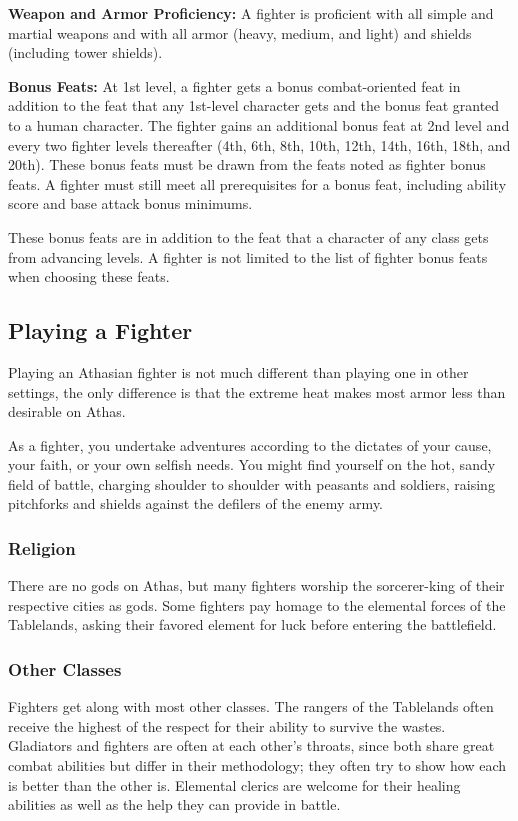 \textbf{Weapon and Armor Proficiency:} A fighter is proficient with all simple and martial weapons and with all armor (heavy, medium, and light) and shields (including tower shields).

\textbf{Bonus Feats:} At 1st level, a fighter gets a bonus combat-oriented feat in addition to the feat that any 1st-level character gets and the bonus feat granted to a human character. The fighter gains an additional bonus feat at 2nd level and every two fighter levels thereafter (4th, 6th, 8th, 10th, 12th, 14th, 16th, 18th, and 20th). These bonus feats must be drawn from the feats noted as fighter bonus feats. A fighter must still meet all prerequisites for a bonus feat, including ability score and base attack bonus minimums.

These bonus feats are in addition to the feat that a character of any class gets from advancing levels. A fighter is not limited to the list of fighter bonus feats when choosing these feats.

\subsection{Playing a Fighter}

Playing an Athasian fighter is not much different than playing one in other settings, the only difference is that the extreme heat makes most armor less than desirable on Athas.

As a fighter, you undertake adventures according to the dictates of your cause, your faith, or your own selfish needs. You might find yourself on the hot, sandy field of battle, charging shoulder to shoulder with peasants and soldiers, raising pitchforks and shields against the defilers of the enemy army.

\subsubsection{Religion}

There are no gods on Athas, but many fighters worship the sorcerer-king of their respective cities as gods. Some fighters pay homage to the elemental forces of the Tablelands, asking their favored element for luck before entering the battlefield.

\subsubsection{Other Classes}

Fighters get along with most other classes. The rangers of the Tablelands often receive the highest of the respect for their ability to survive the wastes. Gladiators and fighters are often at each other's throats, since both share great combat abilities but differ in their methodology; they often try to show how each is better than the other is. Elemental clerics are welcome for their healing abilities as well as the help they can provide in battle.

